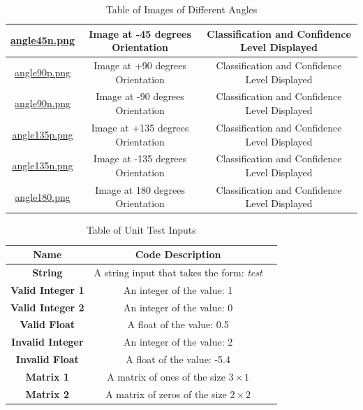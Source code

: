 \documentclass[12pt, titlepage]{article}
\begin{document}
\begin{landscape}
\begin{table}[h!]
\begin{tabular}{|c|c|c|}
      \href{https://github.com/cer-hunter/OAR-CAS741/tree/main/tests/test-images/angle45n.png}{angle45n.png} & Image at -45 degrees Orientation & Classification and Confidence Level Displayed\\ \hline
      \href{https://github.com/cer-hunter/OAR-CAS741/tree/main/tests/test-images/angle90p.png}{angle90p.png} & Image at +90 degrees Orientation & Classification and Confidence Level Displayed\\ \hline
      \href{https://github.com/cer-hunter/OAR-CAS741/tree/main/tests/test-images/angle90n.png}{angle90n.png} & Image at -90 degrees Orientation & Classification and Confidence Level Displayed\\ \hline
      \href{https://github.com/cer-hunter/OAR-CAS741/tree/main/tests/test-images/angle135p.png}{angle135p.png} & Image at +135 degrees Orientation & Classification and Confidence Level Displayed\\ \hline
      \href{https://github.com/cer-hunter/OAR-CAS741/tree/main/tests/test-images/angle135n.png}{angle135n.png} & Image at -135 degrees Orientation & Classification and Confidence Level Displayed\\ \hline
      \href{https://github.com/cer-hunter/OAR-CAS741/tree/main/tests/test-images/angle180.png}{angle180.png} & Image at 180 degrees Orientation & Classification and Confidence Level Displayed\\ \hline
    \end{tabular}
    \caption{Table of Images of Different Angles}
    \label{table_angle}
  \end{table}
\end{landscape}

\begin{table}[h!]
  \centering
  \begin{tabular}{|c|c|c|}
    \hline
    \textbf{Name} & \textbf{Code Description} \\ \hline
    \textbf{String} & A string input that takes the form: \textit{test} \\ \hline
    \textbf{Valid Integer 1} & An integer of the value: 1 \\ \hline
    \textbf{Valid Integer 2} & An integer of the value: 0 \\ \hline
    \textbf{Valid Float} & A float of the value: 0.5 \\ \hline
    \textbf{Invalid Integer} & An integer of the value: 2 \\ \hline
    \textbf{Invalid Float} & A float of the value: -5.4 \\ \hline
    \textbf{Matrix 1} & A matrix of ones of the size $3 \times 1$ \\ \hline
    \textbf{Matrix 2} & A matrix of zeros of the size $2 \times 2$ \\ \hline
    
  \end{tabular}
  \caption{Table of Unit Test Inputs}
  \label{table_unittest}
\end{table}
\end{document}
